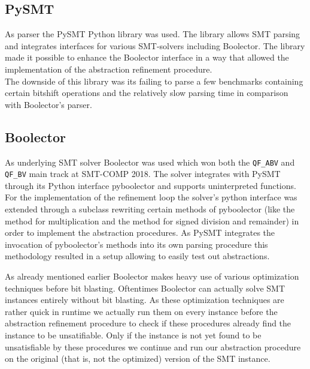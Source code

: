 \subsection{PySMT}
\label{sec:implementation:pysmt}
As parser the PySMT Python library \cite{pysmt2015} was used. The library allows
SMT parsing and integrates interfaces for various SMT-solvers including Boolector.
The library made it possible to enhance the Boolector interface in a way that allowed the implementation
of the abstraction refinement procedure.\\
The downside of this library was its failing to parse a few benchmarks containing certain bitshift operations
and the relatively slow parsing time in comparison with Boolector's parser\footnotemark.

\subsection{Boolector}
\label{sec:implementation:boolector}
As underlying SMT solver Boolector \cite{Brummayer-Biere2009_Chapter_BoolectorAnEfficientSMTSolverF} was used
which won both the \texttt{QF\_ABV} and \texttt{QF\_BV} main track at SMT-COMP 2018\cite{SMTCOMP18}.
The solver integrates with PySMT through its Python interface pyboolector and supports uninterpreted functions.
For the implementation of the refinement loop the solver's python interface was extended through a subclass rewriting certain methods of pyboolector
(like the method for multiplication and the method for signed division and remainder) in order to implement the abstraction procedures.
As PySMT integrates the invocation of pyboolector's methods into its own parsing procedure this methodology resulted in a setup allowing to
easily test out abstractions.
\par
As already mentioned earlier Boolector makes heavy use of various optimization techniques before bit blasting.
Oftentimes Boolector can actually solve SMT instances entirely without bit blasting.
As these optimization techniques are rather quick in runtime we actually run them on every instance before the abstraction refinement procedure to check if these
procedures already find the instance to be unsatifiable.
Only if the instance is not yet found to be unsatisfiable by these procedures we continue and run our abstraction procedure on the original (that is, not the optimized) version of the SMT instance.

